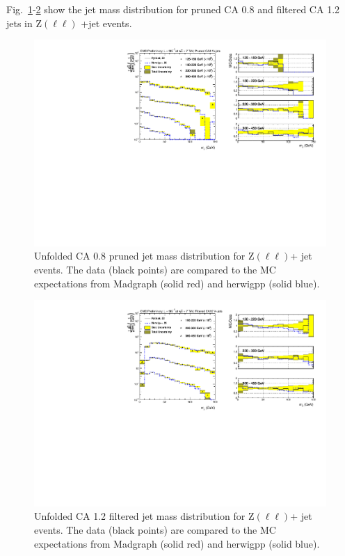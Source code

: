 Fig.~\ref{figs:prunedZmmInt1}-\ref{figs:prunedZmmInt2} show the jet mass distribution for pruned CA 0.8 and filtered CA 1.2 jets in Z$(\ell\ell)$ +jet events.
 
\begin{figure}[!htb]
\centering
\includegraphics[width=0.99\textwidth]{figs/Zll/jetmassunf_ca8pr_log.pdf}
\caption{Unfolded CA 0.8 pruned jet mass distribution for Z$(\ell\ell)$+ jet events. The data (black points) are compared to the MC expectations from Madgraph (solid red) and herwigpp (solid blue).}
\label{figs:prunedZmmInt1}
\end{figure}

\begin{figure}[!htb]
\centering
\includegraphics[width=0.99\textwidth]{figs/Zll/jetmassunf_ca12ft_log.pdf}
\caption{Unfolded CA 1.2 filtered jet mass distribution for Z$(\ell\ell)$+ jet events. The data (black points) are compared to the MC expectations from Madgraph (solid red) and herwigpp (solid blue).}
\label{figs:prunedZmmInt2}
\end{figure}


